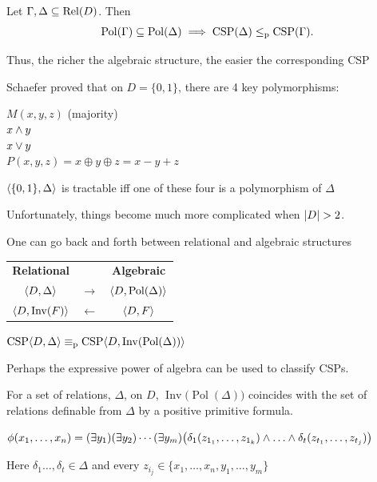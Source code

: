 \documentclass[12pt,xcolor=dvipsnames%
]{beamer}
\DeclareMathOperator{\Rel}{Rel}
\newcommand{\bigpause}{\pause\bigskip}
\DeclareMathOperator{\CSP}{CSP}
\DeclareMathOperator{\Pol}{Pol}
\DeclareMathOperator{\Inv}{Inv}
\renewcommand{\.}{\cdot}
\newcommand{\reduc}{\leq_{\text{\textnormal{p}}}}
\newcommand{\equivp}{\equiv_{\text{\textnormal{p}}}}
\let\origtextbf=\textbf
\let\emph=\alert
\renewcommand{\textbf}[1]{{\usebeamercolor[fg]{example text}%
     \origtextbf{#1}}}
\begin{document}
\begin{frame}
  \begin{theorem}
    Let $\Gamma, \Delta \sseq \Rel(D)$. Then
    \begin{equation*}
      \Pol(\Gamma) \sseq \Pol(\Delta) \implies \CSP(\Delta) \reduc
      \CSP(\Gamma). 
    \end{equation*}
  \end{theorem}

\pause
Thus, the richer the algebraic structure, the easier the corresponding CSP
\end{frame}

\begin{frame}
Schaefer proved that on $D=\{0,1\}$, there are 4 key polymorphisms:

\begin{center}
$M(x,y,z)$ (majority)\\
$x\wedge y$\\
$x\vee y$\\
$P(x,y,z) =x\oplus y \oplus z = x-y+z$
\end{center}

\bigskip
$\langle\{0,1\},\Delta\rangle$ is tractable iff one of these four is a polymorphism of $\Delta$

\bigpause
Unfortunately, things become much more complicated when $\card{D}>2$.
\end{frame}


\begin{frame}
  One can go back and forth between relational and algebraic structures

  \begin{center}
    \begin{tabular}{ccc}
      \origtextbf{Relational} & &\origtextbf{Algebraic}  \\
      $\langle D,\Delta\rangle$ & $\longrightarrow$ & $\<D,\Pol(\Delta)\>$ \\[2pt]
      $\<D, \Inv(F)\>$ & $\longleftarrow$ &$\langle D,F\rangle$
    \end{tabular}
  \end{center}

  $\CSP\<D,\Delta\> \equivp \CSP\<D,\Inv(\Pol(\Delta))\>$

  \bigpause
  Perhaps the expressive power of algebra can be used to classify CSPs.

  \end{frame}

\begin{frame}
For a set of relations, $\Delta$, on $D$, $\Inv\bigl(\Pol(\Delta)\bigr)$ coincides with the set of relations definable from $\Delta$ by a \emph{positive primitive formula}.

\pause
$\phi(x_1,\dots,x_n)=(\exists y_1)(\exists y_2)\cdots(\exists y_m)\bigl(\delta_1(z_{1_1},\dots,z_{1_k}) \meet \dots \meet \delta_t(z_{t_1},\dots,z_{t_j})\bigr)$

Here $\delta_1\dots,\delta_t \in \Delta$ and every $z_{i_j} \in \{x_1,\dots,x_n,y_1,\dots,y_m\}$
\end{frame}
\end{document}
